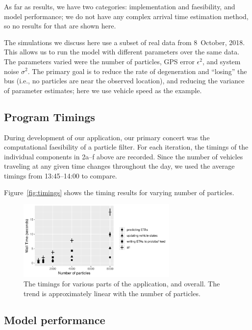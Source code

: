 As far as results, we have two categories:
implementation and faesibility,
and model performance;
we do not have any complex arrival time estimation method,
so no results for that are shown here.


The simulations we discuss here use a subset of real data from 8~October, 2018.
This allows us to run the model with different parameters over the same data.
The parameters varied were the number of particles,
GPS error $\epsilon^2$, and system noise $\sigma^2$.
The primary goal is to reduce the rate of degeneration and ``losing'' the bus 
(i.e., no particles are near the observed location),
and reducing the variance of parameter estimates; here we use vehicle speed as the example.



\subsection{Program Timings}
\label{sec:timings}

During development of our application,
our primary concert was the computational faesibility of a particle filter.
For each iteration, 
the timings of the individual components in 2a--f above are recorded.
Since the number of vehicles traveling at any given time changes throughout the day,
we used the average timings from 13:45--14:00 to compare.


Figure~\ref{fig:timings} shows the timing results for varying number of particles.


\begin{figure}[tb]
    \centering
    \includegraphics[width=0.7\textwidth]{figures/04_model_results_timing.pdf}
    \caption{The timings for various parts of the application, and overall. %
        The trend is approximately linear with the number of particles.}
    \label{fig:figure1}
\end{figure}




\subsection{Model performance}
\label{sec:model_perf}

